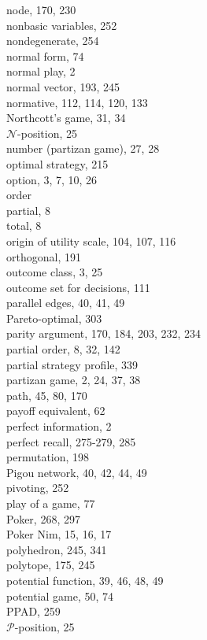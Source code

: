 \documentclass[12pt]{article}
\begin{document}
node, 170, 230\\
nonbasic variables, 252\\
nondegenerate, 254\\
normal form, 74\\
normal play, 2\\
normal vector, 193, 245\\
normative, 112, 114, 120, 133\\
Northcott's game, 31, 34\\
$\mathcal{N}$-position, 25\\
number (partizan game), 27, 28\\
optimal strategy, 215\\
option, 3, 7, 10, 26\\
order\\
partial, 8\\
total, 8\\
origin of utility scale, 104, 107, 116\\
orthogonal, 191\\
outcome class, 3, 25\\
outcome set for decisions, 111\\
parallel edges, 40, 41, 49\\
Pareto-optimal, 303\\
parity argument, 170, 184, 203, 232, 234\\
partial order, 8, 32, 142\\
partial strategy profile, 339\\
partizan game, 2, 24, 37, 38\\
path, 45, 80, 170\\
payoff equivalent, 62\\
perfect information, 2\\
perfect recall, 275-279, 285\\
permutation, 198\\
Pigou network, 40, 42, 44, 49\\
pivoting, 252\\
play of a game, 77\\
Poker, 268, 297\\
Poker Nim, 15, 16, 17\\
polyhedron, 245, 341\\
polytope, 175, 245\\
potential function, 39, 46, 48, 49\\
potential game, 50, 74\\
PPAD, 259\\
$\mathcal{P}$-position, 25\\
\end{document}
